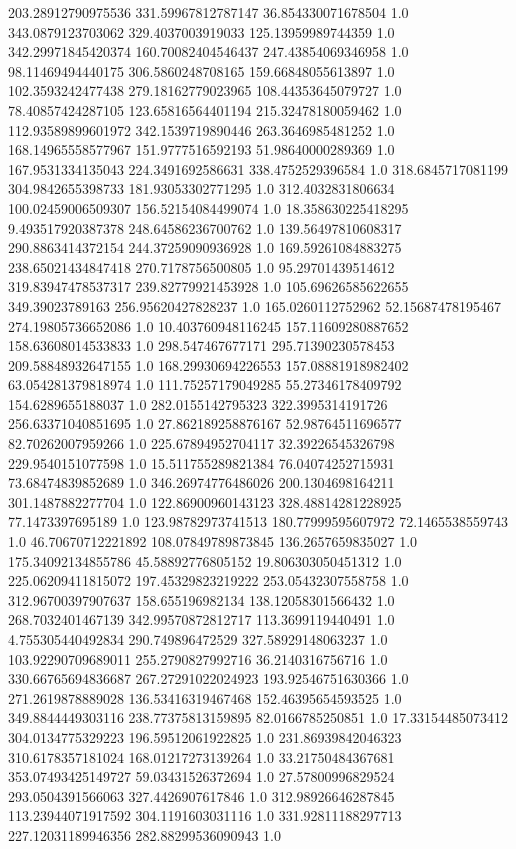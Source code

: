 203.28912790975536	331.59967812787147	36.854330071678504	1.0
343.0879123703062	329.4037003919033	125.13959989744359	1.0
342.29971845420374	160.70082404546437	247.43854069346958	1.0
98.11469494440175	306.5860248708165	159.66848055613897	1.0
102.3593242477438	279.18162779023965	108.44353645079727	1.0
78.40857424287105	123.65816564401194	215.32478180059462	1.0
112.93589899601972	342.1539719890446	263.3646985481252	1.0
168.14965558577967	151.9777516592193	51.98640000289369	1.0
167.9531334135043	224.3491692586631	338.4752529396584	1.0
318.6845717081199	304.9842655398733	181.93053302771295	1.0
312.4032831806634	100.02459006509307	156.52154084499074	1.0
18.358630225418295	9.493517920387378	248.64586236700762	1.0
139.56497810608317	290.8863414372154	244.37259090936928	1.0
169.59261084883275	238.65021434847418	270.7178756500805	1.0
95.29701439514612	319.83947478537317	239.82779921453928	1.0
105.69626585622655	349.39023789163	256.95620427828237	1.0
165.0260112752962	52.15687478195467	274.19805736652086	1.0
10.403760948116245	157.11609280887652	158.63608014533833	1.0
298.547467677171	295.71390230578453	209.58848932647155	1.0
168.29930694226553	157.08881918982402	63.054281379818974	1.0
111.75257179049285	55.27346178409792	154.6289655188037	1.0
282.0155142795323	322.3995314191726	256.63371040851695	1.0
27.862189258876167	52.98764511696577	82.70262007959266	1.0
225.67894952704117	32.39226545326798	229.9540151077598	1.0
15.511755289821384	76.04074252715931	73.68474839852689	1.0
346.26974776486026	200.1304698164211	301.1487882277704	1.0
122.86900960143123	328.48814281228925	77.1473397695189	1.0
123.98782973741513	180.77999595607972	72.1465538559743	1.0
46.70670712221892	108.07849789873845	136.2657659835027	1.0
175.34092134855786	45.58892776805152	19.806303050451312	1.0
225.06209411815072	197.45329823219222	253.05432307558758	1.0
312.96700397907637	158.655196982134	138.12058301566432	1.0
268.7032401467139	342.99570872812717	113.3699119440491	1.0
4.755305440492834	290.749896472529	327.58929148063237	1.0
103.92290709689011	255.2790827992716	36.2140316756716	1.0
330.66765694836687	267.27291022024923	193.92546751630366	1.0
271.2619878889028	136.53416319467468	152.46395654593525	1.0
349.8844449303116	238.77375813159895	82.0166785250851	1.0
17.33154485073412	304.0134775329223	196.59512061922825	1.0
231.86939842046323	310.6178357181024	168.01217273139264	1.0
33.21750484367681	353.07493425149727	59.03431526372694	1.0
27.57800996829524	293.0504391566063	327.4426907617846	1.0
312.98926646287845	113.23944071917592	304.1191603031116	1.0
331.92811188297713	227.12031189946356	282.88299536090943	1.0
